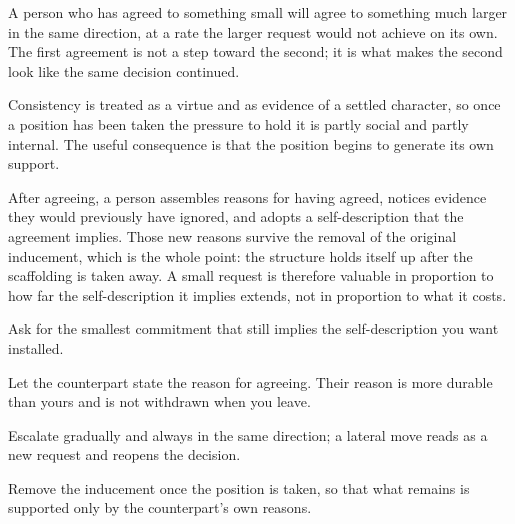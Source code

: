 


\begin{core}
A person who has agreed to something small will agree to something much larger in the same direction, at a rate the larger request would not achieve on its own. The first agreement is not a step toward the second; it is what makes the second look like the same decision continued.
\end{core}

\begin{mechanism}
Consistency is treated as a virtue and as evidence of a settled character, so once a position has been taken the pressure to hold it is partly social and partly internal. The useful consequence is that the position begins to generate its own support.

After agreeing, a person assembles reasons for having agreed, notices evidence they would previously have ignored, and adopts a self-description that the agreement implies. Those new reasons survive the removal of the original inducement, which is the whole point: the structure holds itself up after the scaffolding is taken away. A small request is therefore valuable in proportion to how far the self-description it implies extends, not in proportion to what it costs.
\end{mechanism}

\begin{application}
  \item Ask for the smallest commitment that still implies the self-description you want installed.
  \item Let the counterpart state the reason for agreeing. Their reason is more durable than yours and is not withdrawn when you leave.
  \item Escalate gradually and always in the same direction; a lateral move reads as a new request and reopens the decision.
  \item Remove the inducement once the position is taken, so that what remains is supported only by the counterpart's own reasons.
\end{application}

